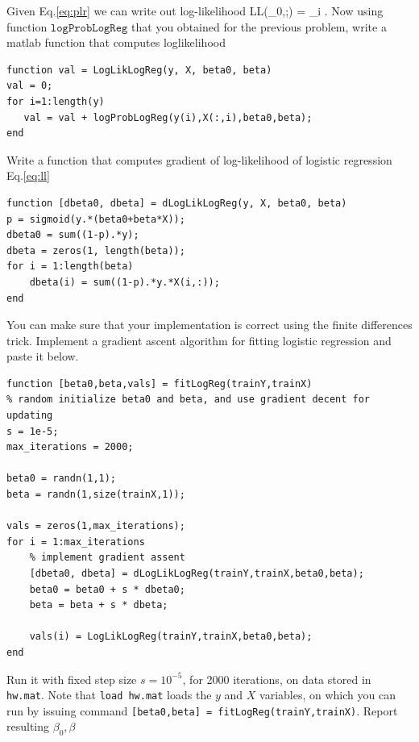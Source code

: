\documentclass{article}
\begin{document}
\newproblem{1pt}
Given Eq.\eqref{eq:plr} we can write out log-likelihood
\BEQ \label{eq:ll}
\textrm{LL}(\beta_0,\beta;) = \sum_i \log {}.
\EEQ
Now using function $\texttt{logProbLogReg}$ that you obtained for the previous problem, write a matlab function that computes loglikelihood
\begin{verbatim}
function val = LogLikLogReg(y, X, beta0, beta)
val = 0;
for i=1:length(y)
   val = val + logProbLogReg(y(i),X(:,i),beta0,beta);
end
\end{verbatim}
\newproblem{1pt}
Write a function that computes gradient of log-likelihood of logistic regression Eq.\eqref{eq:ll}
\begin{verbatim}
function [dbeta0, dbeta] = dLogLikLogReg(y, X, beta0, beta)
p = sigmoid(y.*(beta0+beta*X));
dbeta0 = sum((1-p).*y);
dbeta = zeros(1, length(beta));
for i = 1:length(beta)
    dbeta(i) = sum((1-p).*y.*X(i,:));
end
\end{verbatim}
You can make sure that your implementation is correct using the finite differences trick.
\newproblem{1pt}
Implement a gradient ascent algorithm for fitting logistic regression and paste it below.
\begin{verbatim}
function [beta0,beta,vals] = fitLogReg(trainY,trainX)
% random initialize beta0 and beta, and use gradient decent for updating
s = 1e-5;
max_iterations = 2000;

beta0 = randn(1,1);
beta = randn(1,size(trainX,1));

vals = zeros(1,max_iterations);
for i = 1:max_iterations
    % implement gradient assent
    [dbeta0, dbeta] = dLogLikLogReg(trainY,trainX,beta0,beta);
    beta0 = beta0 + s * dbeta0;
    beta = beta + s * dbeta;
    
    vals(i) = LogLikLogReg(trainY,trainX,beta0,beta);
end
\end{verbatim}
Run it with fixed step size $s=10^{-5}$, for 2000 iterations, on data stored in \texttt{hw\theHW.mat}.
Note that \texttt{load hw\theHW.mat} loads the $y$ and $X$ variables, on which you can run by issuing command
\texttt{[beta0,beta] = fitLogReg(trainY,trainX)}.
Report resulting $\beta_0,\beta$
\end{document}
